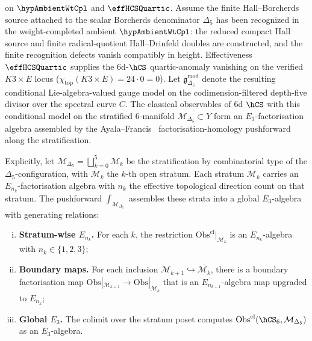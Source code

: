\begin{theorem}
\label{thm:E3-Delta5-AF}
\ClaimStatusConditional{} on $\hypAmbientWtCpl$ and $\effHCSQuartic$.
Assume the finite Hall--Borcherds source attached to the scalar
Borcherds denominator $\Delta_5$ has been recognized in the
weight-completed ambient $\hypAmbientWtCpl$: the reduced
compact Hall source and finite radical-quotient Hall--Drinfeld doubles
are constructed, and the finite recognition defects vanish compatibly
in height. Effectiveness $\effHCSQuartic$ supplies the
6d-$\hCS$ quartic-anomaly vanishing on the verified $K3\times E$ locus
($\chi_{\mathrm{top}}(K3\times E) = 24\cdot 0 = 0$). Let
$\mathfrak{g}_{\Delta_5}^{\mathrm{mod}}$ denote the resulting
conditional Lie-algebra-valued gauge model on the codimension-filtered
depth-five divisor over the spectral curve $C$. The classical
observables of 6d $\hCS$ with this conditional model on the stratified
$6$-manifold $\mathcal{M}_{\Delta_5}\subset Y$ form an
$E_3$-factorisation algebra assembled by the
Ayala--Francis~\cite{AF15} factorisation-homology pushforward along
the stratification.

Explicitly, let
$\mathcal{M}_{\Delta_5} = \bigsqcup_{k=0}^5 \mathcal{M}_k$ be
the stratification by combinatorial type of the
$\Delta_5$-configuration, with $\mathcal{M}_k$ the $k$-th
open stratum. Each stratum $\mathcal{M}_k$ carries an
$E_{n_k}$-factorisation algebra with $n_k$ the effective
topological direction count on that stratum. The pushforward
$\int_{\mathcal{M}_{\Delta_5}}$ assembles these strata into a
global $E_3$-algebra with generating relations:
\begin{enumerate}[(i)]
\item \textbf{Stratum-wise $E_{n_k}$.} For each $k$, the restriction
$\mathrm{Obs}^{\mathrm{cl}}|_{\mathcal{M}_k}$ is an
$E_{n_k}$-algebra with $n_k\in\{1,2,3\}$;
\item \textbf{Boundary maps.} For each inclusion
$\mathcal{M}_{k+1}\hookrightarrow\overline{\mathcal{M}_k}$,
there is a boundary factorisation map
$\mathrm{Obs}|_{\mathcal{M}_{k+1}}\to\mathrm{Obs}|_{\mathcal{M}_k}$
that is an $E_{n_{k+1}}$-algebra map upgraded to $E_{n_k}$;
\item \textbf{Global $E_3$.} The colimit over the stratum poset
computes $\mathrm{Obs}^{\mathrm{cl}}(\hCS_6,\mathcal{M}_{\Delta_5})$
as an $E_3$-algebra.
\end{enumerate}
\end{theorem}

